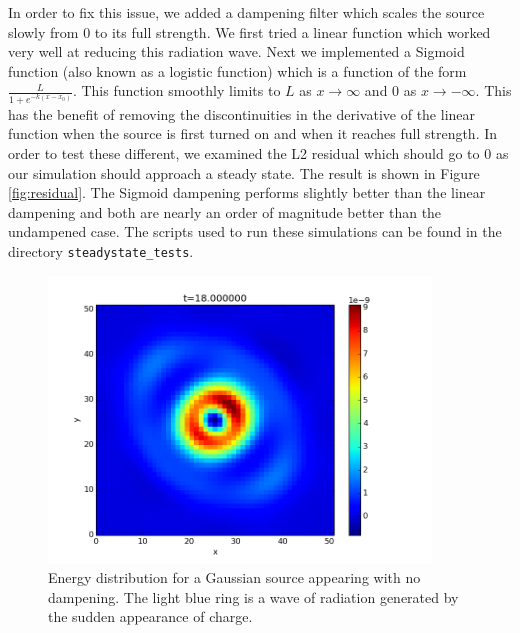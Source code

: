 \documentclass{article}
\begin{document}
	In order to fix this issue, we added a dampening filter which scales the source slowly from 0 to its full strength. We first tried a linear function which worked very well at reducing this radiation wave. Next we implemented a Sigmoid function (also known as a logistic function) which is a function of the form $\frac{L}{1+e^{-k(x-x_0)}}$. This function smoothly limits to $L$ as $x\to\infty$ and $0$ as $x\to-\infty$. This has the benefit of removing the discontinuities in the derivative of the linear function when the source is first turned on and when it reaches full strength. In order to test these different, we examined the L2 residual which should go to 0 as our simulation should approach a steady state. The result is shown in Figure \ref{fig:residual}. The Sigmoid dampening performs slightly better than the linear dampening and both are nearly an order of magnitude better than the undampened case. The scripts used to run these simulations can be found in the directory \texttt{steadystate\_tests}.
	
	\begin{figure}
		\centering
		\includegraphics[width=4in]{shockwave}
		\caption{Energy distribution for a Gaussian source appearing with no dampening. The light blue ring is a wave of radiation generated by the sudden appearance of charge.}
		\label{fig:shockwave}
	\end{figure} 
	
\end{document}
